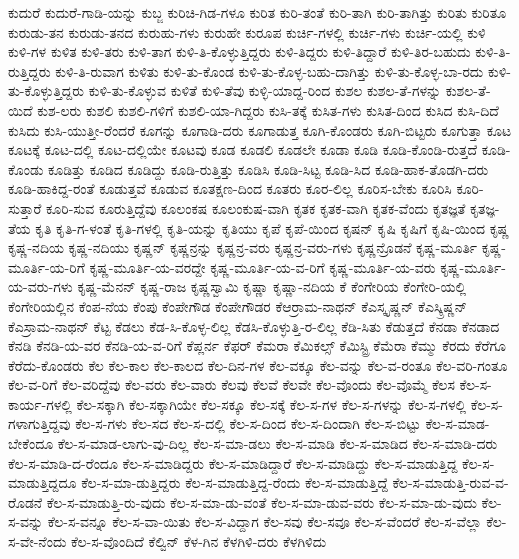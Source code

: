 {ಕುದುರೆ
ಕುದುರೆ-ಗಾಡಿ-ಯನ್ನು
ಕುಬ್ಜ
ಕುರಿಚಿ-ಗಿಡ-ಗಳೂ
ಕುರಿತ
ಕುರಿ-ತಂತೆ
ಕುರಿ-ತಾಗಿ
ಕುರಿ-ತಾಗಿತ್ತು
ಕುರಿತು
ಕುರಿತೂ
ಕುರುಡು-ತನ
ಕುರುಡು-ತನದ
ಕುರುಹು-ಗಳು
ಕುರುಹೇ
ಕುರೂಪ
ಕುರ್ಚಿ-ಗಳಲ್ಲಿ
ಕುರ್ಚಿ-ಗಳು
ಕುರ್ಚಿ-ಯಲ್ಲಿ
ಕುಳಿ
ಕುಳಿ-ಗಳ
ಕುಳಿತ
ಕುಳಿ-ತರು
ಕುಳಿ-ತಾಗ
ಕುಳಿ-ತಿ-ಕೊಳ್ಳುತ್ತಿದ್ದರು
ಕುಳಿ-ತಿದ್ದರು
ಕುಳಿ-ತಿದ್ದಾರೆ
ಕುಳಿ-ತಿರ-ಬಹುದು
ಕುಳಿ-ತಿ-ರುತ್ತಿದ್ದರು
ಕುಳಿ-ತಿ-ರುವಾಗ
ಕುಳಿತು
ಕುಳಿ-ತು-ಕೊಂಡ
ಕುಳಿ-ತು-ಕೊಳ್ಳ-ಬಹು-ದಾಗಿತ್ತು
ಕುಳಿ-ತು-ಕೊಳ್ಳ-ಬಾ-ರದು
ಕುಳಿ-ತು-ಕೊಳ್ಳುತ್ತಿದ್ದರು
ಕುಳಿ-ತು-ಕೊಳ್ಳುವ
ಕುಳಿತೆ
ಕುಳಿ-ತೆವು
ಕುಳ್ಳಿ-ಯಾದ್ದ-ರಿಂದ
ಕುಶಲ
ಕುಶಲ-ತೆ-ಗಳನ್ನು
ಕುಶಲ-ತೆ-ಯಿದೆ
ಕುಶ-ಲರು
ಕುಶಲಿ
ಕುಶಲಿ-ಗಳಿಗೆ
ಕುಶಲಿ-ಯಾ-ಗಿದ್ದರು
ಕುಸಿ-ತಕ್ಕೆ
ಕುಸಿತ-ಗಳು
ಕುಸಿತ-ದಿಂದ
ಕುಸಿದ
ಕುಸಿ-ದಿದೆ
ಕುಸಿದು
ಕುಸಿ-ಯುತ್ತೀ-ರೆಂದರೆ
ಕೂಗನ್ನು
ಕೂಗಾಡಿ-ದರು
ಕೂಗಾಡುತ್ತ
ಕೂಗಿ-ಕೊಂಡರು
ಕೂಗಿ-ಬಿಟ್ಟರು
ಕೂಗುತ್ತಾ
ಕೂಟ
ಕೂಟಕ್ಕೆ
ಕೂಟ-ದಲ್ಲಿ
ಕೂಟ-ದಲ್ಲಿಯೇ
ಕೂಟವು
ಕೂಡ
ಕೂಡಲಿ
ಕೂಡಲೇ
ಕೂಡಾ
ಕೂಡಿ
ಕೂಡಿ-ಕೊಂಡಿ-ರುತ್ತದೆ
ಕೂಡಿ-ಕೊಂಡು
ಕೂಡಿತ್ತು
ಕೂಡಿದ
ಕೂಡಿದ್ದು
ಕೂಡಿ-ರುತ್ತಿತ್ತು
ಕೂಡಿಸಿ
ಕೂಡಿ-ಸಿಟ್ಟ
ಕೂಡಿ-ಸಿದ
ಕೂಡಿ-ಹಾಕ-ತೊಡಗಿ-ದರು
ಕೂಡಿ-ಹಾಕಿದ್ದ-ರಂತೆ
ಕೂಡುತ್ತವೆ
ಕೂಡುವ
ಕೂತಕ್ಷಣ-ದಿಂದ
ಕೂತರು
ಕೂರ-ಲಿಲ್ಲ
ಕೂರಿಸ-ಬೇಕು
ಕೂರಿಸಿ
ಕೂರಿ-ಸುತ್ತಾರೆ
ಕೂರಿ-ಸುವ
ಕೂರುತ್ತಿದ್ದೆವು
ಕೂಲಂಕಷ
ಕೂಲಂಕುಷ-ವಾಗಿ
ಕೃತಕ
ಕೃತಕ-ವಾಗಿ
ಕೃತಕ-ವೆಂದು
ಕೃತಜ್ಞತೆ
ಕೃತಜ್ಞ-ತೆಯ
ಕೃತಿ
ಕೃತಿ-ಗ-ಳಂತೆ
ಕೃತಿ-ಗಳಲ್ಲಿ
ಕೃತಿ-ಯನ್ನು
ಕೃತಿಯು
ಕೃಪೆ
ಕೃಪೆ-ಯಿಂದ
ಕೃಷನ್
ಕೃಷಿ
ಕೃಷಿಗೆ
ಕೃಷಿ-ಯಿಂದ
ಕೃಷ್ಣ
ಕೃಷ್ಣ-ನದಿಯ
ಕೃಷ್ಣ-ನದಿಯು
ಕೃಷ್ಣನ್
ಕೃಷ್ಣನ್ರನ್ನು
ಕೃಷ್ಣನ್ರ-ವರು
ಕೃಷ್ಣನ್ರ-ವರು-ಗಳು
ಕೃಷ್ಣನ್ರೊಡನೆ
ಕೃಷ್ಣ-ಮೂರ್ತಿ
ಕೃಷ್ಣ-ಮೂರ್ತಿ-ಯ-ರಿಗೆ
ಕೃಷ್ಣ-ಮೂರ್ತಿ-ಯ-ವರದ್ದೇ
ಕೃಷ್ಣ-ಮೂರ್ತಿ-ಯ-ವ-ರಿಗೆ
ಕೃಷ್ಣ-ಮೂರ್ತಿ-ಯ-ವರು
ಕೃಷ್ಣ-ಮೂರ್ತಿ-ಯ-ವರು-ಗಳು
ಕೃಷ್ಣ-ಮೆನನ್
ಕೃಷ್ಣ-ರಾಜ
ಕೃಷ್ಣಸ್ವಾಮಿ
ಕೃಷ್ಣಾ
ಕೃಷ್ಣಾ-ನದಿಯ
ಕೆ
ಕೆಂಗೇರಿಯ
ಕೆಂಗೇರಿ-ಯಲ್ಲಿ
ಕೆಂಗೇರಿಯಲ್ಲಿನ
ಕೆಂಪ-ನೆಯ
ಕೆಂಪು
ಕೆಂಪೇಗೌಡ
ಕೆಂಪೇಗೌಡರ
ಕೆಆರ್ರಾಮ-ನಾಥನ್
ಕೆಎಸ್ಕೃಷ್ಣನ್
ಕೆಎಸ್ಕ್ರಿಷ್ಣನ್
ಕೆಎಸ್ರಾಮ-ನಾಥನ್
ಕೆಟ್ಟ
ಕೆಡಲು
ಕೆಡ-ಸಿ-ಕೊಳ್ಳ-ಲಿಲ್ಲ
ಕೆಡಸಿ-ಕೊಳ್ಳುತ್ತಿ-ರ-ಲಿಲ್ಲ
ಕೆಡಿ-ಸಿತು
ಕೆಡುತ್ತದೆ
ಕೆನಡಾ
ಕೆನಡಾದ
ಕೆನಡಿ
ಕೆನಡಿ-ಯ-ವರ
ಕೆನಡಿ-ಯ-ವ-ರಿಗೆ
ಕೆಪ್ಲರ್ನ
ಕೆಫರ್
ಕೆಮರಾ
ಕೆಮಿಕಲ್ಸ್
ಕೆಮಿಸ್ಟ್ರಿ
ಕೆಮೆರಾ
ಕೆಮ್ಮು
ಕೆರದು
ಕೆರೆಗೂ
ಕೆರೆದು-ಕೊಂಡರು
ಕೆಲ
ಕೆಲ-ಕಾಲ
ಕೆಲ-ಕಾಲದ
ಕೆಲ-ದಿನ-ಗಳ
ಕೆಲ-ವಕ್ಕೂ
ಕೆಲ-ವನ್ನು
ಕೆಲ-ವ-ರಂತೂ
ಕೆಲ-ವರಿ-ಗಂತೂ
ಕೆಲ-ವ-ರಿಗೆ
ಕೆಲ-ವರಿದ್ದೆವು
ಕೆಲ-ವರು
ಕೆಲ-ವಾರು
ಕೆಲವು
ಕೆಲವೆ
ಕೆಲವೇ
ಕೆಲ-ವೊಂದು
ಕೆಲ-ವೊಮ್ಮೆ
ಕೆಲಸ
ಕೆಲ-ಸ-ಕಾರ್ಯ-ಗಳಲ್ಲಿ
ಕೆಲ-ಸಕ್ಕಾಗಿ
ಕೆಲ-ಸಕ್ಕಾಗಿಯೇ
ಕೆಲ-ಸಕ್ಕೂ
ಕೆಲ-ಸಕ್ಕೆ
ಕೆಲ-ಸ-ಗಳ
ಕೆಲ-ಸ-ಗಳನ್ನು
ಕೆಲ-ಸ-ಗಳಲ್ಲಿ
ಕೆಲ-ಸ-ಗಳಾಗುತ್ತಿದ್ದವು
ಕೆಲ-ಸ-ಗಳು
ಕೆಲ-ಸದ
ಕೆಲ-ಸ-ದಲ್ಲಿ
ಕೆಲ-ಸ-ದಿಂದ
ಕೆಲ-ಸ-ದಿಂದಾಗಿ
ಕೆಲ-ಸ-ಬಿಟ್ಟು
ಕೆಲ-ಸ-ಮಾಡ-ಬೇಕೆಂದೂ
ಕೆಲ-ಸ-ಮಾಡ-ಲಾಗು-ವು-ದಿಲ್ಲ
ಕೆಲ-ಸ-ಮಾ-ಡಲು
ಕೆಲ-ಸ-ಮಾಡಿ
ಕೆಲ-ಸ-ಮಾಡಿದ
ಕೆಲ-ಸ-ಮಾಡಿ-ದರು
ಕೆಲ-ಸ-ಮಾಡಿ-ದ-ರೆಂದೂ
ಕೆಲ-ಸ-ಮಾಡಿದ್ದರು
ಕೆಲ-ಸ-ಮಾಡಿದ್ದಾರೆ
ಕೆಲ-ಸ-ಮಾಡಿದ್ದು
ಕೆಲ-ಸ-ಮಾಡುತ್ತಿದ್ದ
ಕೆಲ-ಸ-ಮಾಡುತ್ತಿದ್ದದೂ
ಕೆಲ-ಸ-ಮಾ-ಡುತ್ತಿದ್ದರು
ಕೆಲ-ಸ-ಮಾಡುತ್ತಿದ್ದ-ರೆಂದು
ಕೆಲ-ಸ-ಮಾಡುತ್ತಿದ್ದೆ
ಕೆಲ-ಸ-ಮಾಡುತ್ತಿ-ರುವ-ವ-ರೊಡನೆ
ಕೆಲ-ಸ-ಮಾಡುತ್ತಿ-ರು-ವುದು
ಕೆಲ-ಸ-ಮಾ-ಡು-ವಂತೆ
ಕೆಲ-ಸ-ಮಾ-ಡುವ-ವರು
ಕೆಲ-ಸ-ಮಾ-ಡು-ವುದು
ಕೆಲ-ಸ-ವನ್ನು
ಕೆಲ-ಸ-ವನ್ನೂ
ಕೆಲ-ಸ-ವಾ-ಯಿತು
ಕೆಲ-ಸ-ವಿದ್ದಾಗ
ಕೆಲ-ಸವು
ಕೆಲ-ಸವೂ
ಕೆಲ-ಸ-ವೆಂದರೆ
ಕೆಲ-ಸ-ವೆಲ್ಲಾ
ಕೆಲ-ಸ-ವೇ-ನೆಂದು
ಕೆಲ-ಸ-ವೊಂದಿದೆ
ಕೆಲ್ವಿನ್
ಕೆಳ-ಗಿನ
ಕೆಳಗಿಳಿ-ದರು
ಕೆಳಗಿಳಿದು
}
